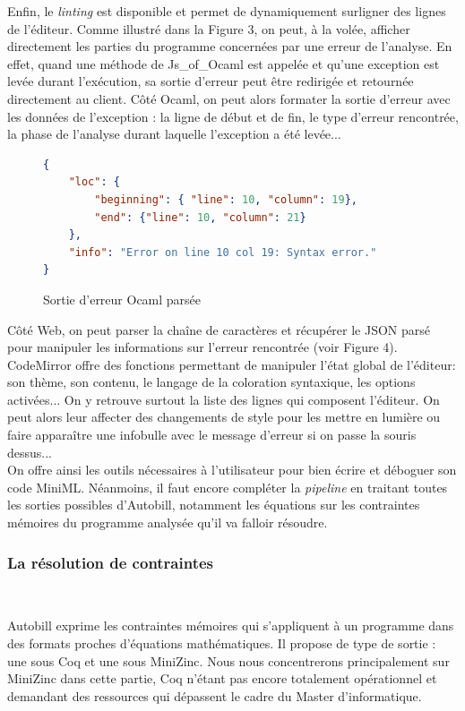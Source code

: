 \documentclass[12pt]{article}
\begin{document}
Enfin, le \textit{linting} est disponible et permet de dynamiquement surligner des lignes de l'éditeur. Comme illustré dans la Figure 3, on peut, à la volée, afficher directement les parties du programme concernées par une erreur de l'analyse. En effet, quand une méthode de Js\_of\_Ocaml est appelée et qu'une exception est levée durant l'exécution, sa sortie d'erreur peut être redirigée et retournée directement au client. Côté Ocaml, on peut alors formater la sortie d'erreur avec les données de l'exception : la ligne de début et de fin, le type d'erreur rencontrée, la phase de l'analyse durant laquelle l'exception a été levée... \\
\begin{figure}
  \centering
\begin{lstlisting}[language=json,firstnumber=1]
{
    "loc": {
        "beginning": { "line": 10, "column": 19},
        "end": {"line": 10, "column": 21}
    },
    "info": "Error on line 10 col 19: Syntax error."
}
\end{lstlisting}
\caption{Sortie d'erreur Ocaml parsée}
\end{figure}

Côté Web, on peut parser la chaîne de caractères et récupérer le JSON parsé pour manipuler les informations sur l'erreur rencontrée (voir Figure 4). CodeMirror offre des fonctions permettant de manipuler l'état global de l'éditeur: son thème, son contenu, le langage de la coloration syntaxique, les options activées... On y retrouve surtout la liste des lignes qui composent l'éditeur. On peut alors leur affecter des changements de style pour les mettre en lumière ou faire apparaître une infobulle avec le message d'erreur si on passe la souris dessus... \\ 

On offre ainsi les outils nécessaires à l'utilisateur pour bien écrire et déboguer son code MiniML. Néanmoins, il faut encore compléter la \textit{pipeline} en traitant toutes les sorties possibles d'Autobill, notamment les équations sur les contraintes mémoires du programme analysée qu'il va falloir résoudre. 

\subsubsection{La résolution de contraintes}\

Autobill exprime les contraintes mémoires qui s'appliquent à un programme dans des formats proches d'équations mathématiques. Il propose de type de sortie : une sous Coq et une sous MiniZinc. Nous nous concentrerons principalement sur MiniZinc dans cette partie, Coq n'étant pas encore totalement opérationnel et demandant des ressources qui dépassent le cadre du Master d'informatique. \\ 
\end{document}
